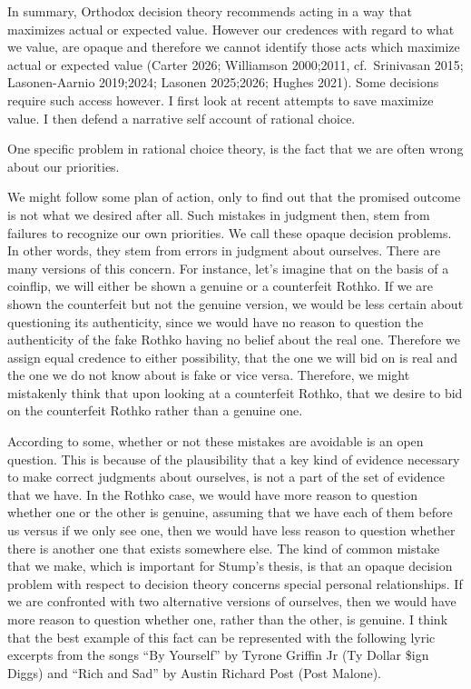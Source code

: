 \documentclass[
  letterpaper,
  DIV=11,
  numbers=noendperiod]{scrartcl}
\begin{document}
In summary, Orthodox decision theory recommends acting in a way that
maximizes actual or expected value. However our credences with regard to
what we value, are opaque and therefore we cannot identify those acts
which maximize actual or expected value (Carter 2026; Williamson
2000;2011, cf.~Srinivasan 2015; Lasonen-Aarnio 2019;2024; Lasonen
2025;2026; Hughes 2021). Some decisions require such access however. I
first look at recent attempts to save maximize value. I then defend a
narrative self account of rational choice.

One specific problem in rational choice theory, is the fact that we are
often wrong about our priorities.

We might follow some plan of action, only to find out that the promised
outcome is not what we desired after all. Such mistakes in judgment
then, stem from failures to recognize our own priorities. We call these
opaque decision problems. In other words, they stem from errors in
judgment about ourselves. There are many versions of this concern. For
instance, let's imagine that on the basis of a coinflip, we will either
be shown a genuine or a counterfeit Rothko. If we are shown the
counterfeit but not the genuine version, we would be less certain about
questioning its authenticity, since we would have no reason to question
the authenticity of the fake Rothko having no belief about the real one.
Therefore we assign equal credence to either possibility, that the one
we will bid on is real and the one we do not know about is fake or vice
versa. Therefore, we might mistakenly think that upon looking at a
counterfeit Rothko, that we desire to bid on the counterfeit Rothko
rather than a genuine one.

According to some, whether or not these mistakes are avoidable is an
open question. This is because of the plausibility that a key kind of
evidence necessary to make correct judgments about ourselves, is not a
part of the set of evidence that we have. In the Rothko case, we would
have more reason to question whether one or the other is genuine,
assuming that we have each of them before us versus if we only see one,
then we would have less reason to question whether there is another one
that exists somewhere else. The kind of common mistake that we make,
which is important for Stump's thesis, is that an opaque decision
problem with respect to decision theory concerns special personal
relationships. If we are confronted with two alternative versions of
ourselves, then we would have more reason to question whether one,
rather than the other, is genuine. I think that the best example of this
fact can be represented with the following lyric excerpts from the songs
``By Yourself'' by Tyrone Griffin Jr (Ty Dollar \$ign Diggs) and ``Rich
and Sad'' by Austin Richard Post (Post Malone).
\end{document}
